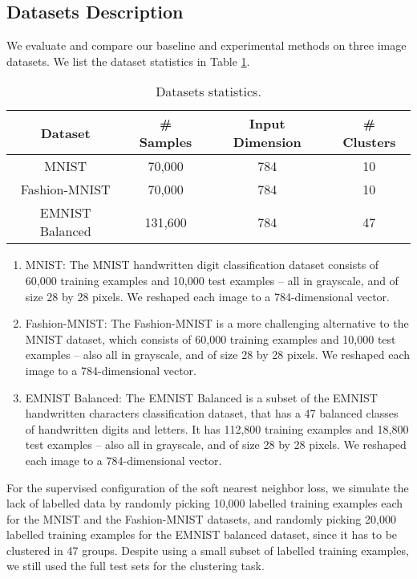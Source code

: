 \documentclass[conference]{IEEEtran}
\begin{document}
\subsection{Datasets Description}
We evaluate and compare our baseline and experimental methods on three image datasets. We list the dataset statistics in Table \ref{tab:data_stats}.
\begin{table}[htb]
    \caption{Datasets statistics.}
    \label{tab:data_stats}
    \centering
    \begin{tabular}{c|c|c|c}
        \hline
         Dataset & \# Samples & Input Dimension & \# Clusters\\
        \hline
         MNIST &  70,000 & 784 & 10\\
         Fashion-MNIST & 70,000 & 784 & 10\\
         EMNIST Balanced & 131,600 & 784 & 47\\
        \hline
    \end{tabular}
\end{table}
\begin{enumerate}
    \item MNIST: The MNIST handwritten digit classification dataset\cite{lecun1998gradient} consists of 60,000 training examples and 10,000 test examples -- all in grayscale, and of size 28 by 28 pixels. We reshaped each image to a 784-dimensional vector.
    \item Fashion-MNIST: The Fashion-MNIST\cite{xiao2017fashion} is a more challenging alternative to the MNIST dataset, which consists of 60,000 training examples and 10,000 test examples -- also all in grayscale, and of size 28 by 28 pixels. We reshaped each image to a 784-dimensional vector.
    \item EMNIST Balanced: The EMNIST Balanced is a subset of the EMNIST handwritten characters classification dataset\cite{cohen2017emnist}, that has a 47 balanced classes of handwritten digits and letters. It has 112,800 training examples and 18,800 test examples -- also all in grayscale, and of size 28 by  28 pixels. We reshaped each image to a 784-dimensional vector.
\end{enumerate}

For the supervised configuration of the soft nearest neighbor loss, we simulate the lack of labelled data by randomly picking 10,000 labelled training examples each for the MNIST and the Fashion-MNIST datasets, and randomly picking 20,000 labelled training examples for the EMNIST balanced dataset, since it has to be clustered in 47 groups. Despite using a small subset of labelled training examples, we still used the full test sets for the clustering task.
\end{document}
